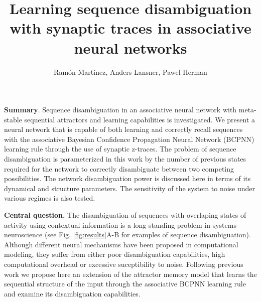 \documentclass[12pt, a4paper]{article}
\title{\vspace{-1.8cm} \myfont Learning sequence disambiguation with synaptic traces in associative neural networks}
\author{\myfont  Ram\'on Mart\'inez, Anders Lansner, Pawel Herman}
\begin{document}
\date{}
\maketitle

\textbf{Summary}. Sequence disambiguation in an associative neural network with meta-stable sequential attractors and learning capabilities is investigated. We present a neural network that is capable of both learning and correctly recall sequences with the associative Bayesian Confidence Propagation Neural Network (BCPNN)  learning rule through the use of synaptic z-traces. The problem of sequence disambiguation is parameterized in this work by the number of previous states required for the network to correctly disambiguate between two competing possibilities. The network disambiguation power is discussed here in terms of its dynamical and structure parameters. The sensitivity of the system to noise under various regimes is also tested. 

\textbf{Central question.} The disambiguation of sequences with overlaping states of activity using contextual information is a long standing problem in systems neuroscience \cite{levy1996sequence} (see Fig. \ref{fig:results}A-B for examples of sequence disambiguation). Although different neural mechanisms have been proposed in computational modeling, they suffer from either poor disambiguation capabilities, high computational overhead or excessive suceptibility to noise. Following previous work \cite{tully2016spike, lansner2009associative} we propose here an extension of the attractor memory model that learns the sequential structure of the input through the associative BCPNN learning rule and examine its disambiguation capabilities.


\end{document}
